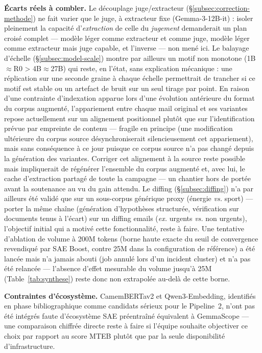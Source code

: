 \documentclass[11pt]{article}
\begin{document}
\textbf{Écarts réels à combler.} Le découplage juge/extracteur
(\S\ref{subsec:correction-methode}) ne fait varier que le juge, à extracteur
fixe (Gemma-3-12B-it) : isoler pleinement la capacité d'\emph{extraction} de
celle du \emph{jugement} demanderait un plan croisé complet --- modèle léger
comme extracteur et comme juge, modèle léger comme extracteur mais juge
capable, et l'inverse --- non mené ici. Le balayage d'échelle
(\S\ref{subsec:model-scale}) montre par ailleurs un motif non monotone
(1B$\approx$R0 > 4B$\approx$27B) qui reste, en l'état, sans explication
mécanique : une réplication sur une seconde graine à chaque échelle
permettrait de trancher si ce motif est stable ou un artefact de bruit sur
un seul tirage par point. En raison d'une contrainte d'indexation apparue
lors d'une évolution antérieure du format du corpus augmenté, l'appariement
entre chaque mail original et ses variantes repose actuellement sur un
alignement positionnel plutôt que sur l'identification prévue par empreinte
de contenu --- fragile en principe (une modification ultérieure du corpus
source désynchroniserait silencieusement cet appariement), mais sans
conséquence à ce jour puisque ce corpus source n'a pas changé depuis la
génération des variantes. Corriger cet alignement à la source reste possible
mais impliquerait de régénérer l'ensemble du corpus augmenté et, avec lui,
le cache d'extraction partagé de toute la campagne --- un chantier hors de
portée avant la soutenance au vu du gain attendu.
Le diffing (\S\ref{subsec:diffing}) n'a par ailleurs été validé que sur un
sous-corpus générique proxy (énergie \emph{vs.} sport) --- porter la même
chaîne (génération d'hypothèses structurée, vérification sur documents tenus
à l'écart) sur un diffing emails (\emph{ex.} urgents \emph{vs.} non urgents),
l'objectif initial qui a motivé cette fonctionnalité, reste à faire. Une
tentative d'ablation de volume à 200M tokens (borne haute exacte du seuil de
convergence revendiqué par SAE Boost, contre 25M dans la configuration de
référence) a été lancée mais n'a jamais abouti (job annulé lors d'un
incident cluster) et n'a pas été relancée --- l'absence d'effet mesurable du
volume jusqu'à 25M (Table~\ref{tab:synthese}) reste donc non extrapolée
au-delà de cette borne.

\textbf{Contraintes d'écosystème.} CamemBERTav2 et Qwen3-Embedding,
identifiés en phase bibliographique comme candidats sérieux pour le
Pipeline~2, n'ont pas été intégrés faute d'écosystème SAE préentraîné
équivalent à GemmaScope --- une comparaison chiffrée directe reste à faire
si l'équipe souhaite objectiver ce choix par rapport au score MTEB plutôt
que par la seule disponibilité d'infrastructure.
\end{document}
